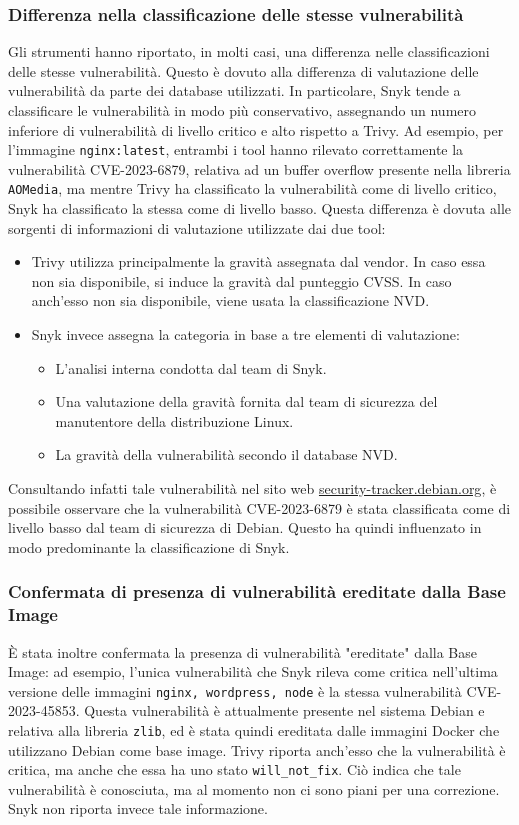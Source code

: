 \subsubsection{Differenza nella classificazione delle stesse vulnerabilità}
Gli strumenti hanno riportato, in molti casi, una differenza nelle classificazioni delle stesse vulnerabilità. Questo è dovuto alla differenza di valutazione delle vulnerabilità da parte dei database utilizzati. In particolare, Snyk tende a classificare le vulnerabilità in modo più conservativo, assegnando un numero inferiore di vulnerabilità di livello critico e alto rispetto a Trivy. Ad esempio, per l'immagine \texttt{nginx:latest}, entrambi i tool hanno rilevato correttamente la vulnerabilità CVE-2023-6879, relativa ad un buffer overflow presente nella libreria \texttt{AOMedia}, ma mentre Trivy ha classificato la vulnerabilità come di livello critico, Snyk ha classificato la stessa come di livello basso. Questa differenza è dovuta alle sorgenti di informazioni di valutazione utilizzate dai due tool:
\begin{itemize}
   \item Trivy utilizza principalmente la gravità assegnata dal vendor. In caso essa non sia disponibile, si induce la gravità dal punteggio CVSS. In caso anch'esso non sia disponibile, viene usata la classificazione NVD.
   \item Snyk invece assegna la categoria in base a tre elementi di valutazione:
         \begin{itemize}
            \item L'analisi interna condotta dal team di Snyk.
            \item Una valutazione della gravità fornita dal team di sicurezza del manutentore della distribuzione Linux.
            \item La gravità della vulnerabilità secondo il database NVD.
         \end{itemize}
\end{itemize}
Consultando infatti tale vulnerabilità nel sito web \url{security-tracker.debian.org}, è possibile osservare che la vulnerabilità CVE-2023-6879 è stata classificata come di livello basso dal team di sicurezza di Debian. Questo ha quindi influenzato in modo predominante la classificazione di Snyk.
\subsubsection{Confermata di presenza di vulnerabilità ereditate dalla Base Image}
È stata inoltre confermata la presenza di vulnerabilità "ereditate" dalla Base Image: ad esempio, l'unica vulnerabilità che Snyk rileva come critica nell'ultima versione delle immagini \texttt{nginx, wordpress, node} è la stessa vulnerabilità CVE-2023-45853. Questa vulnerabilità è attualmente presente nel sistema Debian e relativa alla libreria \texttt{zlib}, ed è stata quindi ereditata dalle immagini Docker che utilizzano Debian come base image.
Trivy riporta anch'esso che la vulnerabilità è critica, ma anche che essa ha uno stato \texttt{will\_not\_fix}. Ciò indica che tale vulnerabilità è conosciuta, ma al momento non ci sono piani per una correzione. Snyk non riporta invece tale informazione.


